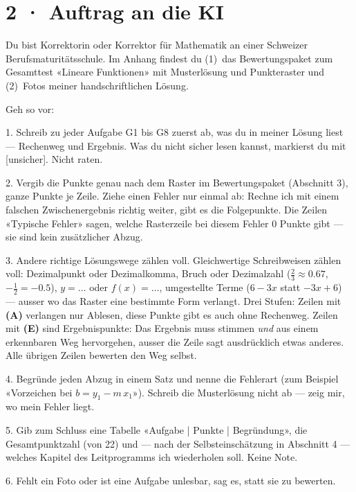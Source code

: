\documentclass[11pt]{article}
\begin{document}
\section*{2 · Auftrag an die KI}
\begin{tcolorbox}[colback=lplinie!25,colframe=lplinie,boxrule=0.5pt,arc=1mm,fontupper=\small]
Du bist Korrektorin oder Korrektor für Mathematik an einer Schweizer Berufsmaturitätsschule. Im Anhang findest du (1)~das Bewertungspaket zum Gesamttest «Lineare Funktionen» mit Musterlösung und Punkteraster und (2)~Fotos meiner handschriftlichen Lösung.\par\medskip
Geh so vor:\par
1. Schreib zu jeder Aufgabe G1 bis G8 zuerst ab, was du in meiner Lösung liest — Rechenweg und Ergebnis. Was du nicht sicher lesen kannst, markierst du mit [unsicher]. Nicht raten.\par
2. Vergib die Punkte genau nach dem Raster im Bewertungspaket (Abschnitt 3), ganze Punkte je Zeile. Ziehe einen Fehler nur einmal ab: Rechne ich mit einem falschen Zwischenergebnis richtig weiter, gibt es die Folgepunkte. Die Zeilen «Typische Fehler» sagen, welche Rasterzeile bei diesem Fehler 0 Punkte gibt — sie sind kein zusätzlicher Abzug.\par
3. Andere richtige Lösungswege zählen voll. Gleichwertige Schreibweisen zählen voll: Dezimalpunkt oder Dezimalkomma, Bruch oder Dezimalzahl ($\tfrac23 \approx 0.67$, $-\tfrac12 = -0.5$), $y = \ldots$ oder $f(x) = \ldots$, umgestellte Terme ($6 - 3x$ statt $-3x + 6$) — ausser wo das Raster eine bestimmte Form verlangt. Drei Stufen: Zeilen mit \textbf{(A)} verlangen nur Ablesen, diese Punkte gibt es auch ohne Rechenweg. Zeilen mit \textbf{(E)} sind Ergebnispunkte: Das Ergebnis muss stimmen \emph{und} aus einem erkennbaren Weg hervorgehen, ausser die Zeile sagt ausdrücklich etwas anderes. Alle übrigen Zeilen bewerten den Weg selbst.\par
4. Begründe jeden Abzug in einem Satz und nenne die Fehlerart (zum Beispiel «Vorzeichen bei $b = y_1 - m\,x_1$»). Schreib die Musterlösung nicht ab — zeig mir, wo mein Fehler liegt.\par
5. Gib zum Schluss eine Tabelle «Aufgabe | Punkte | Begründung», die Gesamtpunktzahl (von 22) und — nach der Selbsteinschätzung in Abschnitt 4 — welches Kapitel des Leitprogramms ich wiederholen soll. Keine Note.\par
6. Fehlt ein Foto oder ist eine Aufgabe unlesbar, sag es, statt sie zu bewerten.
\end{tcolorbox}
\end{document}
